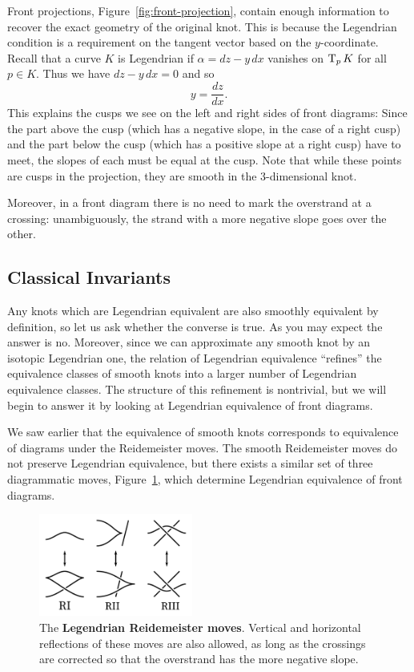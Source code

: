 Front projections, Figure~\ref{fig:front-projection}, contain enough information to recover the exact geometry of the original knot. This is because the Legendrian condition is a requirement on the tangent vector based on the $y$-coordinate. Recall that a curve $K$ is Legendrian if ${\alpha = dz - y\, dx}$ vanishes on $\operatorname{T}_p K$ for all $p \in K$. Thus we have ${dz - y \, dx = 0}$ and so
\[
    y = \frac{dz}{dx}.
\]
This explains the cusps we see on the left and right sides of front diagrams: Since the part above the cusp (which has a negative slope, in the case of a right cusp) and the part below the cusp (which has a positive slope at a right cusp) have to meet, the slopes of each must be equal at the cusp. Note that while these points are cusps in the projection, they are smooth in the 3-dimensional knot.

Moreover, in a front diagram there is no need to mark the overstrand at a crossing: unambiguously, the strand with a more negative slope goes over the other.

\subsection{Classical Invariants}\label{subsec:invariants}

Any knots which are Legendrian equivalent are also smoothly equivalent by definition, so let us ask whether the converse is true.
As you may expect the answer is no. Moreover, since we can approximate any smooth knot by an isotopic Legendrian one, the relation of Legendrian equivalence ``refines'' the equivalence classes of smooth knots into a larger number of Legendrian equivalence classes.
The structure of this refinement is nontrivial, but we will begin to answer it by looking at Legendrian equivalence of front diagrams.

We saw earlier that the equivalence of smooth knots corresponds to equivalence of diagrams under the Reidemeister moves. The smooth Reidemeister moves do not preserve Legendrian equivalence, but there exists a similar set of three diagrammatic moves, Figure~\ref{fig:redemeister}, which determine Legendrian equivalence of front diagrams.

\begin{figure}[ht]
    \centering
    \includegraphics[width=0.45\textwidth]{images/redeimeister.pdf}
    \caption{The \textbf{Legendrian Reidemeister moves}. Vertical and horizontal reflections of these moves are also allowed, as long as the crossings are corrected so that the overstrand has the more negative slope.}%
    \label{fig:redemeister}
\end{figure}

